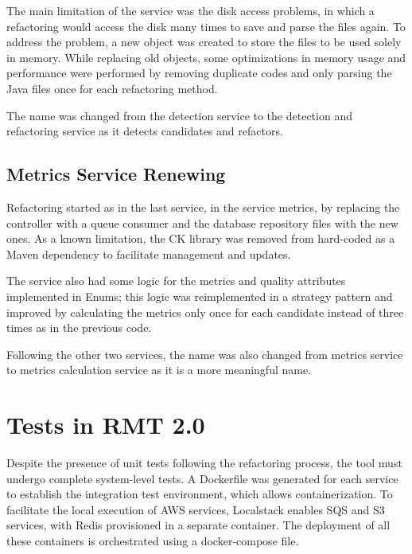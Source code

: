 The main limitation of the service was the disk access problems, in which a refactoring would access the disk many times to save and parse the files again. To address the problem, a new object was created to store the files to be used solely in memory. While replacing old objects, some optimizations in memory usage and performance were performed by removing duplicate codes and only parsing the Java files once for each refactoring method.

The name was changed from the detection service to the detection and refactoring service as it detects candidates and refactors.



\subsection{Metrics Service Renewing}
\label{sec-restruct-metrics}

Refactoring started as in the last service, in the service metrics, by replacing the controller with a queue consumer and the database repository files with the new ones. As a known limitation, the CK library \textcite{ck} was removed from hard-coded as a Maven dependency to facilitate management and updates. 

The service also had some logic for the metrics and quality attributes implemented in Enums; this logic was reimplemented in a strategy pattern and improved by calculating the metrics only once for each candidate instead of three times as in the previous code.

Following the other two services, the name was also changed from metrics service to metrics calculation service as it is a more meaningful name. 


\section{Tests in RMT 2.0}
\label{sec-test-rmt}

Despite the presence of unit tests following the refactoring process, the tool must undergo complete system-level tests. A Dockerfile was generated for each service to establish the integration test environment, which allows containerization. To facilitate the local execution of AWS services, Localstack \cite{localstack} enables SQS and S3 services, with Redis provisioned in a separate container. The deployment of all these containers is orchestrated using a docker-compose file.

